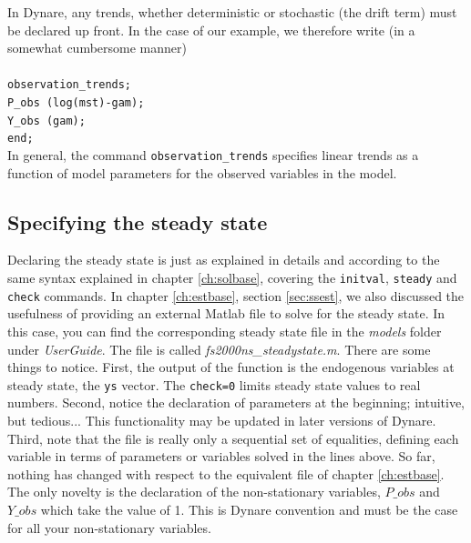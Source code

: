 In Dynare, any trends, whether deterministic or stochastic (the drift term) must be declared up front. In the case of our example, we therefore write (in a somewhat cumbersome manner)\\
\\
\texttt{observation\_trends;\\
P\_obs (log(mst)-gam);\\
Y\_obs (gam);\\
end;}\\

In general, the command \texttt{observation\_trends} specifies linear trends as a function of model parameters for the observed variables in the model.\\


\subsection{Specifying the steady state}
Declaring the steady state is just as explained in details and according to the same syntax explained in chapter \ref{ch:solbase}, covering the \texttt{initval}, \texttt{steady} and \texttt{check} commands. In chapter \ref{ch:estbase}, section \ref{sec:ssest}, we also discussed the usefulness of providing an external Matlab file to solve for the steady state. In this case, you can find the corresponding steady state file in the \textsl{models} folder under \textsl{UserGuide}. The file is called \textsl{fs2000ns\_steadystate.m}. There are some things to notice. First, the output of the function is the endogenous variables at steady state, the \texttt{ys} vector. The \texttt{check=0} limits steady state values to real numbers. Second, notice the declaration of parameters at the beginning; intuitive, but tedious... This functionality may be updated in later versions of Dynare. Third, note that the file is really only a sequential set of equalities, defining each variable in terms of parameters or variables solved in the lines above. So far, nothing has changed with respect to the equivalent file of chapter \ref{ch:estbase}. The only novelty is the declaration of the non-stationary variables, $P\_obs$ and $Y\_obs$ which take the value of 1. This is Dynare convention and must be the case for all your non-stationary variables. 

